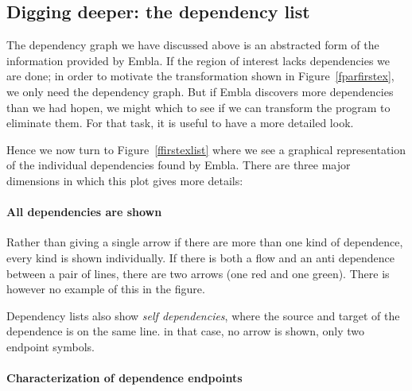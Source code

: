 \subsection{Digging deeper: the dependency list}

The dependency graph we have discussed above is an abstracted form of
the information provided by Embla. If the region of interest lacks
dependencies we are done; in order to motivate the transformation
shown in Figure~\ref{fparfirstex}, we only need the dependency
graph. But if Embla discovers more dependencies than we had hopen, we
might which to see if we can transform the program to eliminate them.
For that task, it is useful to have a more detailed look.

Hence we now turn to Figure~\ref{ffirstexlist} where we see a
graphical representation of the individual dependencies found by
Embla. There are three major dimensions in which this plot gives more
details:

\paragraph*{All dependencies are shown} 

Rather than giving a single arrow if there are more than one kind of
dependence, every kind is shown individually. If there is both a flow
and an anti dependence between a pair of lines, there are two arrows
(one red and one green). There is however no example of this in the
figure.

Dependency lists also show {\em self dependencies}, where the source
and target of the dependence is on the same line. in that case, no
arrow is shown, only two endpoint symbols. 

\paragraph*{Characterization of dependence endpoints}

